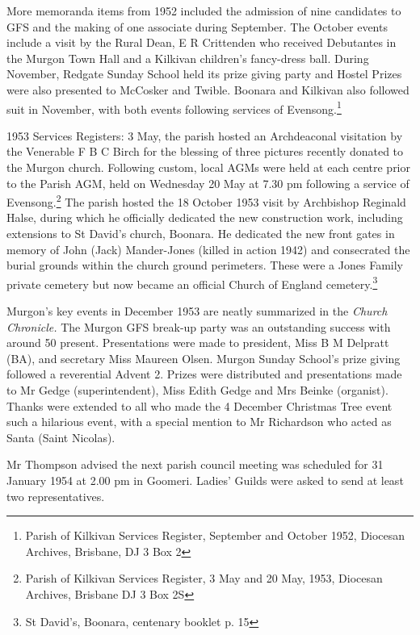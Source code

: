 More memoranda items from 1952 included the admission of nine candidates to GFS and the making of one associate during September. The October events include a visit by the Rural Dean, E R Crittenden who received Debutantes in the Murgon Town Hall and a Kilkivan children's fancy-dress ball. During November, Redgate Sunday School held its prize giving party and Hostel Prizes were also presented to McCosker and Twible. Boonara and Kilkivan also followed suit in November, with both events following services of Evensong.\footnote{Parish of Kilkivan Services Register, September and October 1952, Diocesan Archives, Brisbane, DJ 3 Box 2}


1953 Services Registers: 3 May, the parish hosted an Archdeaconal visitation by the Venerable F B C Birch for the blessing of three pictures recently donated to the Murgon church. Following custom, local AGMs were held at each centre prior to the Parish AGM, held on Wednesday 20 May at 7.30 pm following a service of Evensong.\footnote{Parish of Kilkivan Services Register, 3 May and 20 May, 1953, Diocesan Archives, Brisbane DJ 3 Box 2S} The parish hosted the 18 October 1953 visit by Archbishop Reginald Halse, during which he officially dedicated the new construction work, including extensions to St David's church, Boonara. He dedicated the new front gates in memory of John (Jack) Mander-Jones (killed in action 1942) and consecrated the burial grounds within the church ground perimeters. These were a Jones Family private cemetery but now became an official Church of England cemetery.\footnote{St David's, Boonara, centenary booklet p. 15}


Murgon's key events in December 1953 are neatly summarized in the \emph{Church Chronicle.} The Murgon GFS break-up party was an outstanding success with around 50 present. Presentations were made to president, Miss B M Delpratt (BA), and secretary Miss Maureen Olsen. Murgon Sunday School's prize giving followed a reverential Advent 2. Prizes were distributed and presentations made to Mr Gedge (superintendent), Miss Edith Gedge and Mrs Beinke (organist). Thanks were extended to all who made the 4 December Christmas Tree event such a hilarious event, with a special mention to Mr Richardson who acted as Santa (Saint Nicolas).



Mr Thompson advised the next parish council meeting was scheduled for 31 January 1954 at 2.00 pm in Goomeri. Ladies' Guilds were asked to send at least two representatives.




